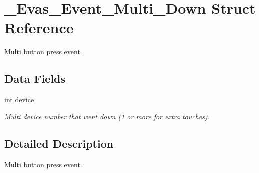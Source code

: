\section{\_\-Evas\_\-Event\_\-Multi\_\-Down Struct Reference}
\label{struct__Evas__Event__Multi__Down}


Multi button press event.  


\subsection*{Data Fields}
\begin{DoxyCompactItemize}
\item 
int \hyperlink{struct__Evas__Event__Multi__Down_a990b8c081ce4bb5b494ae6632b78cbe4}{device}\label{struct__Evas__Event__Multi__Down_a990b8c081ce4bb5b494ae6632b78cbe4}

\begin{DoxyCompactList}\small\item\em Multi device number that went down (1 or more for extra touches). \item\end{DoxyCompactList}\end{DoxyCompactItemize}


\subsection{Detailed Description}
Multi button press event. 
